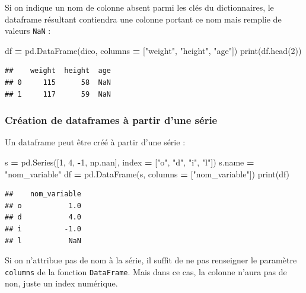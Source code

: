 \documentclass[
  12pt,
]{book}
\newenvironment{Shaded}{\begin{snugshade}}{\end{snugshade}}
\newcommand{\BuiltInTok}[1]{#1}
\newcommand{\DecValTok}[1]{\textcolor[rgb]{0.00,0.00,0.81}{#1}}
\newcommand{\NormalTok}[1]{#1}
\newcommand{\OperatorTok}[1]{\textcolor[rgb]{0.81,0.36,0.00}{\textbf{#1}}}
\newcommand{\StringTok}[1]{\textcolor[rgb]{0.31,0.60,0.02}{#1}}
\numberwithin{equation}{section}
\numberwithin{countremarque}{section}
\begin{document}
Si on indique un nom de colonne absent parmi les clés du dictionnaires, le dataframe résultant contiendra une colonne portant ce nom mais remplie de valeurs \texttt{NaN} :

\begin{Shaded}
\begin{Highlighting}[]
\NormalTok{df }\OperatorTok{=}\NormalTok{ pd.DataFrame(dico, columns }\OperatorTok{=}\NormalTok{ [}\StringTok{"weight"}\NormalTok{, }\StringTok{"height"}\NormalTok{, }\StringTok{"age"}\NormalTok{])}
\BuiltInTok{print}\NormalTok{(df.head(}\DecValTok{2}\NormalTok{))}
\end{Highlighting}
\end{Shaded}

\begin{lstlisting}
##    weight  height  age
## 0     115      58  NaN
## 1     117      59  NaN
\end{lstlisting}

\subsubsection{Création de dataframes à partir d'une série}\label{cruxe9ation-de-dataframes-uxe0-partir-dune-suxe9rie}

Un dataframe peut être créé à partir d'une série :

\begin{Shaded}
\begin{Highlighting}[]
\NormalTok{s }\OperatorTok{=}\NormalTok{ pd.Series([}\DecValTok{1}\NormalTok{, }\DecValTok{4}\NormalTok{, }\OperatorTok{{-}}\DecValTok{1}\NormalTok{, np.nan], index }\OperatorTok{=}\NormalTok{ [}\StringTok{"o"}\NormalTok{, }\StringTok{"d"}\NormalTok{, }\StringTok{"i"}\NormalTok{, }\StringTok{"l"}\NormalTok{])}
\NormalTok{s.name }\OperatorTok{=} \StringTok{"nom\_variable"}
\NormalTok{df }\OperatorTok{=}\NormalTok{ pd.DataFrame(s, columns }\OperatorTok{=}\NormalTok{ [}\StringTok{"nom\_variable"}\NormalTok{])}
\BuiltInTok{print}\NormalTok{(df)}
\end{Highlighting}
\end{Shaded}

\begin{lstlisting}
##    nom_variable
## o           1.0
## d           4.0
## i          -1.0
## l           NaN
\end{lstlisting}

Si on n'attribue pas de nom à la série, il suffit de ne pas renseigner le paramètre \texttt{columns} de la fonction \texttt{DataFrame}. Mais dans ce cas, la colonne n'aura pas de non, juste un index numérique.
\end{document}
